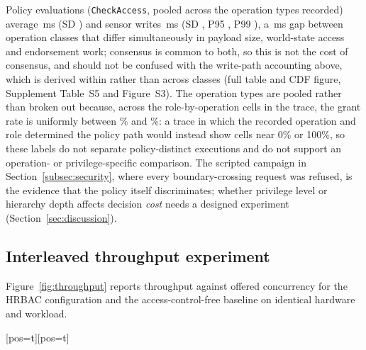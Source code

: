 \documentclass[a4paper,fleqn]{cas-dc}
\makeatletter
\newenvironment{widefig}[1][pos=t]
  {\ifdoublecol \@nameuse{figure*}[#1]\else \@nameuse{figure}[#1]\fi}
  {\ifdoublecol \@nameuse{endfigure*}\else \@nameuse{endfigure}\fi}
\makeatother
\begin{document}
Policy evaluations (\texttt{CheckAccess}, pooled across the \DecisionOps{}
operation types recorded) average \DecisionMean\,ms (SD \DecisionSD) and
sensor writes \WriteMean\,ms (SD \WriteSD, P95 \WritePNinetyFive, P99
\WritePNinetyNine), a \CommitCost\,ms gap between operation classes that
differ simultaneously in payload size, world-state access and endorsement
work; consensus is common to both, so this is not the cost of consensus,
and should not be confused with the write-path accounting above, which is
derived within rather than across classes (full table and CDF figure,
Supplement Table~S5 and Figure~S3). The \DecisionOps{} operation types are
pooled rather than broken out because, across the \PolicyCells{}
role-by-operation cells in the trace, the grant rate is uniformly between
\PolicyGrantMin\% and \PolicyGrantMax\%: a trace in which the recorded
operation and role determined the policy path would instead show cells
near 0\% or 100\%, so these labels do not separate policy-distinct
executions and do not support an operation- or privilege-specific
comparison. The scripted campaign in Section~\ref{subsec:security}, where
every boundary-crossing request was refused, is the evidence that the
policy itself discriminates; whether privilege level or hierarchy depth
affects decision \emph{cost} needs a designed experiment
(Section~\ref{sec:discussion}).

\subsection{Interleaved throughput experiment}
\label{subsec:throughput}

Figure~\ref{fig:throughput} reports throughput against offered concurrency
for the HRBAC configuration and the access-control-free baseline on
identical hardware and workload.

\begin{widefig}
\centering
{}
\caption{Mean throughput and standard deviation across five interleaved runs per concurrency level.}
\label{fig:throughput}
\end{widefig}
\end{document}
